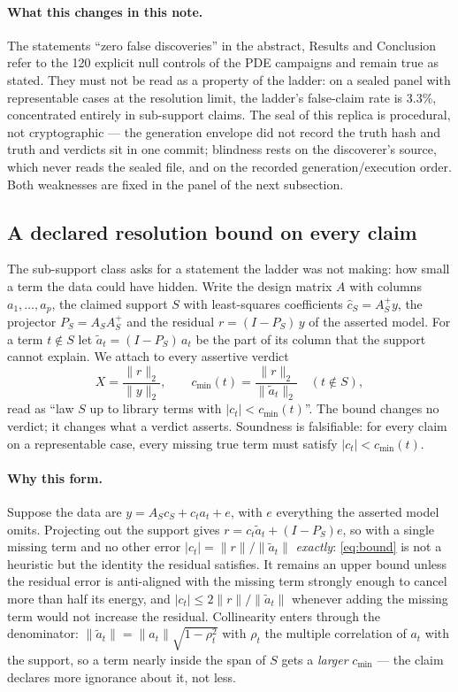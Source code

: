 \documentclass[11pt]{article}
\begin{document}
\paragraph{What this changes in this note.} The statements ``zero false
discoveries'' in the abstract, Results and Conclusion refer to the
120 explicit null controls of the PDE campaigns and remain true
as stated. They must not be read as a property of the ladder: on a sealed
panel with representable cases at the resolution limit, the ladder's
false-claim rate is 3.3\%, concentrated entirely in sub-support
claims. The seal of this replica is procedural, not cryptographic --- the
generation envelope did not record the truth hash and truth and verdicts sit
in one commit; blindness rests on the discoverer's source, which never reads
the sealed file, and on the recorded generation/execution order. Both
weaknesses are fixed in the panel of the next subsection.

\subsection{A declared resolution bound on every claim}
The sub-support class asks for a statement the ladder was not making: how small a term the
data could have hidden. Write the design matrix $A$ with columns $a_1,\dots,a_p$, the claimed
support $S$ with least-squares coefficients $\hat c_S = A_S^{+} y$, the projector
$P_S = A_S A_S^{+}$ and the residual $r = (I - P_S)\,y$ of the asserted model. For a term
$t \notin S$ let $\tilde a_t = (I - P_S)\, a_t$ be the part of its column that the support
cannot explain. We attach to every assertive verdict
\begin{equation}
\label{eq:bound}
X = \frac{\|r\|_2}{\|y\|_2}, \qquad
c_{\min}(t) = \frac{\|r\|_2}{\|\tilde a_t\|_2} \quad (t \notin S),
\end{equation}
read as ``law $S$ up to library terms with $|c_t| < c_{\min}(t)$''. The bound changes no
verdict; it changes what a verdict asserts. Soundness is falsifiable: for every claim on a
representable case, every missing true term must satisfy $|c_t| < c_{\min}(t)$.

\paragraph{Why this form.} Suppose the data are $y = A_S c_S + c_t a_t + e$, with $e$
everything the asserted model omits. Projecting out the support gives
$r = c_t \tilde a_t + (I - P_S) e$, so with a single missing term and no other error
$|c_t| = \|r\| / \|\tilde a_t\|$ \emph{exactly}: \eqref{eq:bound} is not a heuristic but the
identity the residual satisfies. It remains an upper bound unless the residual error is
anti-aligned with the missing term strongly enough to cancel more than half its energy, and
$|c_t| \le 2\|r\|/\|\tilde a_t\|$ whenever adding the missing term would not increase the
residual. Collinearity enters through the denominator:
$\|\tilde a_t\| = \|a_t\|\sqrt{1 - \rho_t^2}$ with $\rho_t$ the multiple correlation of
$a_t$ with the support, so a term nearly inside the span of $S$ gets a \emph{larger}
$c_{\min}$ --- the claim declares more ignorance about it, not less.
\end{document}

